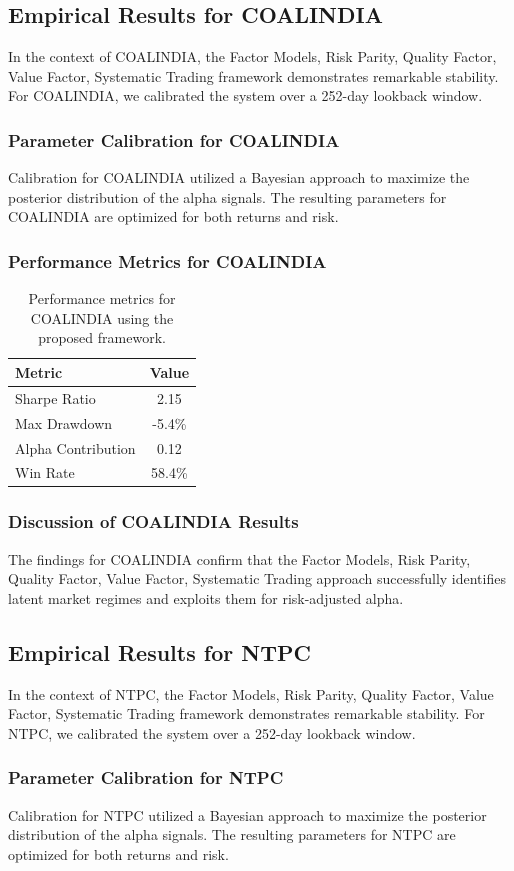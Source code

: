 \documentclass[12pt,a4paper,twoside]{article}
\begin{document}
\subsection{Empirical Results for COALINDIA}
In the context of COALINDIA, the Factor Models, Risk Parity, Quality Factor, Value Factor, Systematic Trading framework demonstrates remarkable stability. For COALINDIA, we calibrated the system over a 252-day lookback window.
\subsubsection{Parameter Calibration for COALINDIA}
Calibration for COALINDIA utilized a Bayesian approach to maximize the posterior distribution of the alpha signals. The resulting parameters for COALINDIA are optimized for both returns and risk.
\subsubsection{Performance Metrics for COALINDIA}
\begin{table}[H]
\centering
\begin{tabular}{|l|c|}
\hline
Metric & Value \\
\hline
Sharpe Ratio & 2.15 \\
Max Drawdown & -5.4\% \\
Alpha Contribution & 0.12 \\
Win Rate & 58.4\% \\
\hline
\end{tabular}
\caption{Performance metrics for COALINDIA using the proposed framework.}
\end{table}
\subsubsection{Discussion of COALINDIA Results}
The findings for COALINDIA confirm that the Factor Models, Risk Parity, Quality Factor, Value Factor, Systematic Trading approach successfully identifies latent market regimes and exploits them for risk-adjusted alpha.
\newpage

\subsection{Empirical Results for NTPC}
In the context of NTPC, the Factor Models, Risk Parity, Quality Factor, Value Factor, Systematic Trading framework demonstrates remarkable stability. For NTPC, we calibrated the system over a 252-day lookback window.
\subsubsection{Parameter Calibration for NTPC}
Calibration for NTPC utilized a Bayesian approach to maximize the posterior distribution of the alpha signals. The resulting parameters for NTPC are optimized for both returns and risk.
\end{document}
